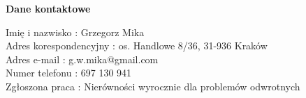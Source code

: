 \documentclass[]{article}
\begin{document}
\begin{center}
	\huge{{\bf Dane kontaktowe}}
\end{center}
\vspace{0.5cm}
	\begin{flushleft}
	

	Imię i nazwisko : Grzegorz Mika\\
	Adres korespondencyjny : os. Handlowe 8/36, 31-936 Kraków\\
	Adres e-mail : g.w.mika@gmail.com\\
	Numer telefonu : 697 130 941\\
	Zgłoszona praca : Nierówności wyrocznie dla problemów odwrotnych
\end{flushleft}
\end{document}
